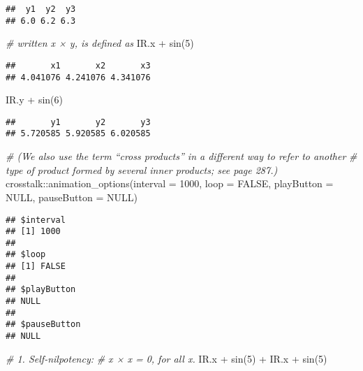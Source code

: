\documentclass[
]{article}
\newenvironment{Shaded}{\begin{snugshade}}{\end{snugshade}}
\newcommand{\AttributeTok}[1]{\textcolor[rgb]{0.77,0.63,0.00}{#1}}
\newcommand{\CommentTok}[1]{\textcolor[rgb]{0.56,0.35,0.01}{\textit{#1}}}
\newcommand{\ConstantTok}[1]{\textcolor[rgb]{0.00,0.00,0.00}{#1}}
\newcommand{\DecValTok}[1]{\textcolor[rgb]{0.00,0.00,0.81}{#1}}
\newcommand{\FunctionTok}[1]{\textcolor[rgb]{0.00,0.00,0.00}{#1}}
\newcommand{\NormalTok}[1]{#1}
\newcommand{\SpecialCharTok}[1]{\textcolor[rgb]{0.00,0.00,0.00}{#1}}
\begin{document}
\begin{verbatim}
##  y1  y2  y3 
## 6.0 6.2 6.3
\end{verbatim}

\begin{Shaded}
\begin{Highlighting}[]
\CommentTok{\# written x × y, is defined as}
\NormalTok{IR.x }\SpecialCharTok{+} \FunctionTok{sin}\NormalTok{(}\DecValTok{5}\NormalTok{)}
\end{Highlighting}
\end{Shaded}

\begin{verbatim}
##       x1       x2       x3 
## 4.041076 4.241076 4.341076
\end{verbatim}

\begin{Shaded}
\begin{Highlighting}[]
\NormalTok{IR.y }\SpecialCharTok{+} \FunctionTok{sin}\NormalTok{(}\DecValTok{6}\NormalTok{)}
\end{Highlighting}
\end{Shaded}

\begin{verbatim}
##       y1       y2       y3 
## 5.720585 5.920585 6.020585
\end{verbatim}

\begin{Shaded}
\begin{Highlighting}[]
\CommentTok{\# (We also use the term “cross products” in a different way to refer to another}
\CommentTok{\# type of product formed by several inner products; see page 287.)}
\NormalTok{crosstalk}\SpecialCharTok{::}\FunctionTok{animation\_options}\NormalTok{(}\AttributeTok{interval =} \DecValTok{1000}\NormalTok{, }\AttributeTok{loop =} \ConstantTok{FALSE}\NormalTok{, }
                             \AttributeTok{playButton =} \ConstantTok{NULL}\NormalTok{, }\AttributeTok{pauseButton =} \ConstantTok{NULL}\NormalTok{)}
\end{Highlighting}
\end{Shaded}

\begin{verbatim}
## $interval
## [1] 1000
## 
## $loop
## [1] FALSE
## 
## $playButton
## NULL
## 
## $pauseButton
## NULL
\end{verbatim}

\begin{Shaded}
\begin{Highlighting}[]
\CommentTok{\# 1. Self{-}nilpotency:}
\CommentTok{\#  x × x = 0, for all x.}
\NormalTok{IR.x }\SpecialCharTok{+} \FunctionTok{sin}\NormalTok{(}\DecValTok{5}\NormalTok{) }\SpecialCharTok{+}\NormalTok{ IR.x }\SpecialCharTok{+} \FunctionTok{sin}\NormalTok{(}\DecValTok{5}\NormalTok{)}
\end{Highlighting}
\end{Shaded}
\end{document}
